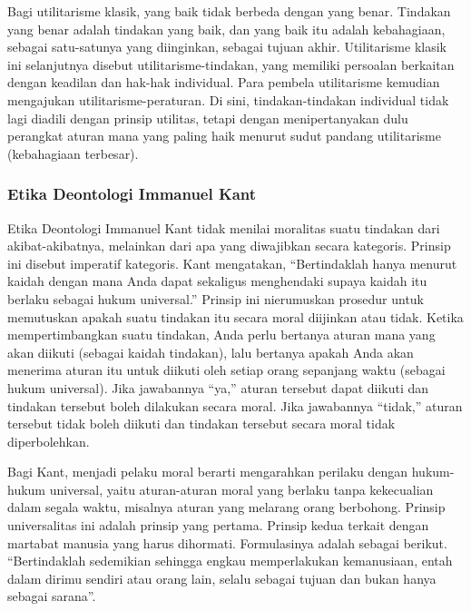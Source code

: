 \documentclass[10pt,a4paper]{article}
\begin{document}
\begin{multicols}{2}
Bagi utilitarisme klasik, yang baik tidak berbeda dengan yang benar.
Tindakan yang benar adalah tindakan yang baik, dan yang baik itu adalah
kebahagiaan, sebagai satu-satunya yang diinginkan, sebagai tujuan akhir.
Utilitarisme klasik ini selanjutnya disebut utilitarisme-tindakan, yang
memiliki persoalan berkaitan dengan keadilan dan hak-hak individual.
Para pembela utilitarisme kemudian mengajukan utilitarisme-peraturan. Di
sini, tindakan-tindakan individual tidak lagi diadili dengan prinsip
utilitas, tetapi dengan menipertanyakan dulu perangkat aturan mana yang
paling haik menurut sudut pandang utilitarisme (kebahagiaan terbesar).

\hypertarget{etika-deontologi-immanuel-kant}{%
\subsubsection{Etika Deontologi Immanuel
Kant}\label{etika-deontologi-immanuel-kant}}

Etika Deontologi Immanuel Kant tidak menilai moralitas suatu tindakan
dari akibat-akibatnya, melainkan dari apa yang diwajibkan secara
kategoris. Prinsip ini disebut imperatif kategoris. Kant mengatakan,
``Bertindaklah hanya menurut kaidah dengan mana Anda dapat sekaligus
menghendaki supaya kaidah itu berlaku sebagai hukum universal.'' Prinsip
ini nierumuskan prosedur untuk memutuskan apakah suatu tindakan itu
secara moral diijinkan atau tidak. Ketika mempertimbangkan suatu
tindakan, Anda perlu bertanya aturan mana yang akan diikuti (sebagai
kaidah tindakan), lalu bertanya apakah Anda akan menerima aturan itu
untuk diikuti oleh setiap orang sepanjang waktu (sebagai hukum
universal). Jika jawabannya ``ya,'' aturan tersebut dapat diikuti dan
tindakan tersebut boleh dilakukan secara moral. Jika jawabannya
``tidak,'' aturan tersebut tidak boleh diikuti dan tindakan tersebut
secara moral tidak diperbolehkan.

Bagi Kant, menjadi pelaku moral berarti mengarahkan perilaku dengan
hukum-hukum universal, yaitu aturan-aturan moral yang berlaku tanpa
kekecualian dalam segala waktu, misalnya aturan yang melarang orang
berbohong. Prinsip universalitas ini adalah prinsip yang pertama.
Prinsip kedua terkait dengan martabat manusia yang harus dihormati.
Formulasinya adalah sebagai berikut. ``Bertindaklah sedemikian sehingga
engkau memperlakukan kemanusiaan, entah dalam dirimu sendiri atau orang
lain, selalu sebagai tujuan dan bukan hanya sebagai sarana''.


\end{multicols}
\end{document}
